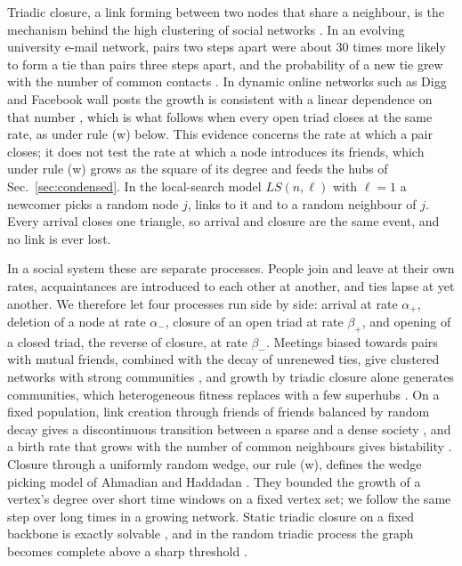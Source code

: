 \documentclass[aps,pre,twocolumn,superscriptaddress,floatfix,nofootinbib]{revtex4-2}
\begin{document}
Triadic closure, a link forming between two nodes that share a neighbour, is
the mechanism behind the high clustering of social networks
\cite{granovetter1973,davidsen2002,holme2002,vazquez2003,toivonen2006,jackson2007}.
In an evolving university e-mail network, pairs two steps apart were about 30
times more likely to form a tie than pairs three steps apart, and the
probability of a new tie grew with the number of common contacts
\cite{kossinets2006}. In dynamic online networks such as Digg and Facebook wall
posts the growth is consistent with a linear dependence on that number
\cite{ahmadian2021}, which is what follows when every open triad closes at the
same rate, as under rule (w) below. This evidence concerns the rate at which a
pair closes; it does not test the rate at which a node introduces its friends,
which under rule (w) grows as the square of its degree and feeds the hubs of
Sec.~\ref{sec:condensed}.
In the local-search model $LS(n,\ell)$ \cite{vazquez2001,vazquez2003,book} with
$\ell=1$ a newcomer picks a random node $j$, links to it and to a random
neighbour of $j$. Every arrival closes one triangle, so arrival and closure are
the same event, and no link is ever lost.

In a social system these are separate processes. People join and leave at
their own rates, acquaintances are introduced to each other at another, and
ties lapse at yet another. We therefore let four processes run side by side:
arrival at rate $\alpha_+$, deletion of a node at rate $\alpha_-$, closure of an
open triad at rate $\beta_+$, and opening of a closed triad, the reverse of
closure, at rate $\beta_-$. Meetings biased towards pairs with mutual friends,
combined with the decay of unrenewed ties, give clustered networks with strong
communities \cite{jin2001}, and growth by triadic closure alone generates
communities, which heterogeneous fitness replaces with a few superhubs
\cite{bianconi2014}. On a fixed population, link creation through friends of
friends balanced by random decay gives a discontinuous transition between a
sparse and a dense society \cite{marsili2004}, and a birth rate that grows with
the number of common neighbours gives bistability \cite{grindrod2012}. Closure
through a uniformly random wedge, our rule (w), defines the wedge picking model
of Ahmadian and Haddadan \cite{ahmadian2021}. They bounded the growth of a
vertex's degree over short time windows on a fixed vertex set; we follow the
same step over long times in a growing network. Static
triadic closure on a fixed backbone is exactly solvable \cite{cirigliano2024},
and in the random triadic process the graph becomes complete above a sharp
threshold \cite{korandi2016}.
\end{document}
